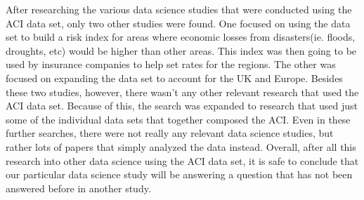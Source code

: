 \documentclass[letterpaper]{report}
\begin{document}
		\newpage
		After researching the various data science studies that were conducted using the ACI data set, only two other studies were found. One focused on using the data set to build a risk index for areas where economic losses from disasters(ie. floods, droughts, etc)  would be higher than other areas. This index was then going to be used by insurance companies to help set rates for the regions. The other was focused on expanding the data set to account for the UK and Europe. Besides these two studies, however, there wasn't any other relevant research that used the ACI data set. Because of this, the search was expanded to research that used just some of the individual data sets that together composed the ACI. Even in these further searches, there were not really any relevant data science studies, but rather lots of papers that simply analyzed the data instead. Overall, after all this research into other data science using the ACI data set, it is safe to conclude that our particular data science study will be answering a question that has not been answered before in another study.
		
		
		
		
	
\end{document}
